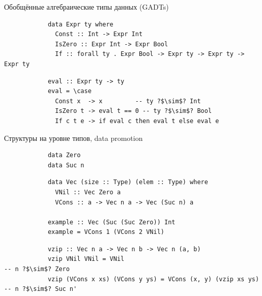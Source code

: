     \begin{frame}[fragile]{Обобщённые алгебраические типы данных (GADTs)}
        \pause
        \begin{verbatim}
            data Expr ty where
              Const :: Int -> Expr Int
              IsZero :: Expr Int -> Expr Bool
              If :: forall ty . Expr Bool -> Expr ty -> Expr ty -> Expr ty
        \end{verbatim}

        \pause\hspace{2em}
        \begin{verbatim}
            eval :: Expr ty -> ty
            eval = \case
              Const x  -> x         -- ty ?$\sim$? Int
              IsZero t -> eval t == 0 -- ty ?$\sim$? Bool
              If c t e -> if eval c then eval t else eval e
        \end{verbatim}
    \end{frame}

    \begin{frame}[fragile]{Структуры на уровне типов, data promotion}
        \pause
        \begin{verbatim}
            data Zero
            data Suc n
        \end{verbatim}

        \pause\hspace{2em}
        \begin{verbatim}
            data Vec (size :: Type) (elem :: Type) where
              VNil :: Vec Zero a
              VCons :: a -> Vec n a -> Vec (Suc n) a

            example :: Vec (Suc (Suc Zero)) Int
            example = VCons 1 (VCons 2 VNil)
        \end{verbatim}

        \pause\hspace{2em}
        \begin{verbatim}
            vzip :: Vec n a -> Vec n b -> Vec n (a, b)
            vzip VNil VNil = VNil                                      -- n ?$\sim$? Zero
            vzip (VCons x xs) (VCons y ys) = VCons (x, y) (vzip xs ys) -- n ?$\sim$? Suc n'
        \end{verbatim}
    \end{frame}

